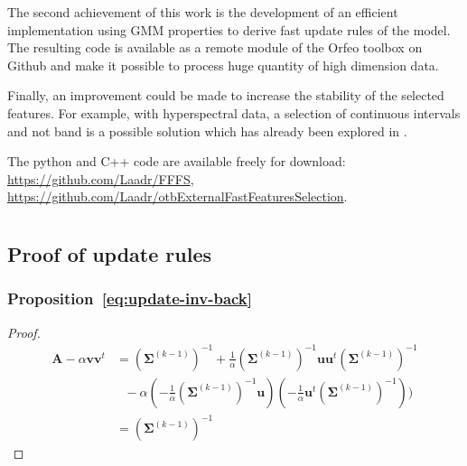 \documentclass[journal,peerreview,onecolumn]{IEEEtran}
\begin{document}
The second achievement of this work is the development of an efficient implementation using GMM properties to derive fast update rules of the model. The resulting code is available as a remote module of the Orfeo toolbox on Github and make it possible to process huge quantity of high dimension data.

Finally, an improvement could be made to increase the stability of the selected features. For example, with hyperspectral data, a selection of continuous intervals and not band is a possible solution which has already been explored in \cite{serpico2007extraction}.

The python and C++ code are available freely for download: \url{https://github.com/Laadr/FFFS}, \url{https://github.com/Laadr/otbExternalFastFeaturesSelection}.

\appendices
\section{}
\label{app:proof-update}
\subsection{Proof of update rules}
    \subsubsection{Proposition~\ref{eq:update-inv-back}}
        \begin{proof}
            \begin{align*}
                \mathbf{A} - \alpha \mathbf{v} \mathbf{v}^t
                &= (\boldsymbol{\Sigma}^{(k-1)})^{-1} + \frac{1}{\alpha} (\boldsymbol{\Sigma}^{(k-1)})^{-1} \mathbf{u} \mathbf{u}^t (\boldsymbol{\Sigma}^{(k-1)})^{-1} \\
                &~~~- \alpha (- \frac{1}{\alpha} (\boldsymbol{\Sigma}^{(k-1)})^{-1} \mathbf{u}) (- \frac{1}{\alpha} \mathbf{u}^t (\boldsymbol{\Sigma}^{(k-1)})^{-1})) \\
                &= (\boldsymbol{\Sigma}^{(k-1)})^{-1}
            \end{align*}
        \end{proof}
\end{document}
